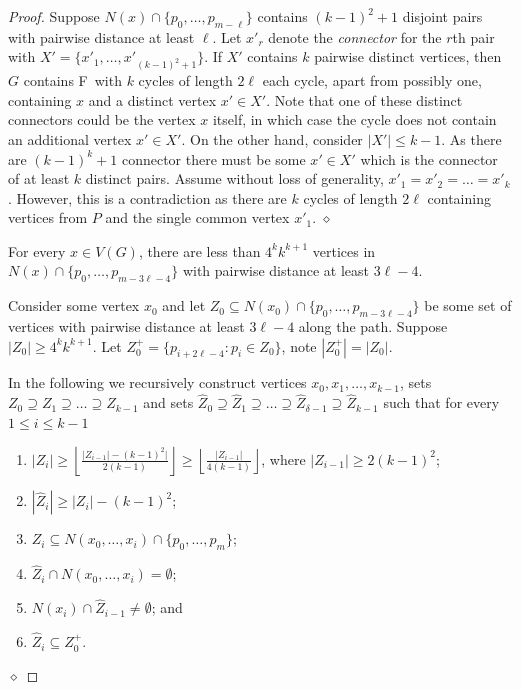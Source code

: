 \documentclass[runningheads,envcountsame]{llncs}
\newcommand{\forbiddenGraph}{F}
\newenvironment{claimproof}
{\noindent {\em Proof of Claim:} }
{\hfill $\diamond$ \smallskip}
\begin{document}
\begin{proof}
\begin{claimproof}
            Suppose $N(x) \cap \{p_0,\dots,p_{m-\ell}\}$ contains $(k-1)^2+1$ disjoint pairs with pairwise distance at least $\ell$. Let $x'_r$ denote the \emph{connector} for the $r$th pair with $X' = \{x'_1,\dots, x'_{(k-1)^2+1}\}$. If $X'$ contains $k$ pairwise distinct vertices, then $G$ contains \forbiddenGraph\ with $k$ cycles of length $2\ell$ each cycle, apart from possibly one, containing $x$ and a distinct vertex $x' \in X'$. Note that one of these distinct connectors could be the vertex $x$ itself, in which case the cycle does not contain an additional vertex $x'\in X'$. 
            On the other hand, consider $|X'| \leq k-1$. As there are $(k-1)^k+1$ connector there must be some $x'\in X'$ which is the connector of at least $k$ distinct pairs. Assume without loss of generality, $x'_1=x'_2=\ldots=x'_k$. However, this is a contradiction as there are $k$ cycles of length $2\ell$ containing vertices from $P$ and the single common vertex $x'_1$.
    \end{claimproof}

    \begin{mclaim}\label{clm:vbndnei}
            For every $x \in V(G)$, there are less than $4^kk^{k+1}$ vertices in $N(x) \cap \{p_0,\dots,p_{m-3\ell-4}\}$ 
            with pairwise distance at least $3\ell-4$.
    \end{mclaim}
    \begin{claimproof}
        Consider some vertex $x_0$ and let $Z_0 \subseteq N(x_0) \cap \{p_0,\dots,p_{m-3\ell-4}\}$ be some set of vertices with pairwise distance at least $3\ell-4$ along the path. Suppose $|Z_0| \geq 4^kk^{k+1}$. 
        Let $Z^+_0 = \{ p_{i+2\ell-4}: p_i \in Z_0 \}$, note $|Z^+_0| = |Z_0|$.
        
         In the following we recursively construct vertices $x_0, x_1,\ldots,x_{k-1}$, sets $Z_{0} \supseteq Z_1 \supseteq \ldots \supseteq Z_{k-1}$ and sets $\hat{Z}_{0} \supseteq \hat{Z}_{1} \supseteq \ldots \supseteq \hat{Z}_{\delta-1} \supseteq \hat{Z}_{k-1}$ such that for every $1\leq i \leq k-1$
         \begin{enumerate}
             \item $|Z_i|\geq \left\lfloor {\frac{|Z_{i-1}|- (k-1)^2|}{2(k-1)}} \right\rfloor \geq \left\lfloor {\frac{|Z_{i-1}|}{4(k-1)}} \right\rfloor$, where $|Z_{i-1}| \geq 2(k-1)^2$;
             \item $|\hat{Z}_i|\geq |Z_i|-(k-1)^2$;
             \item $Z_i\subseteq N(x_0, \dots, x_i)\cap \{p_0,\dots, p_m\}$;
             \item $\hat{Z}_i\cap N(x_0,\dots, x_{i})=\emptyset$;
             \item $N(x_i)\cap \hat{Z}_{i-1}\neq \emptyset$; and 
             \item $\hat{Z}_i\subseteq Z_0^+$.
         \end{enumerate} 
        

\end{claimproof}
\end{proof}
\end{document}
